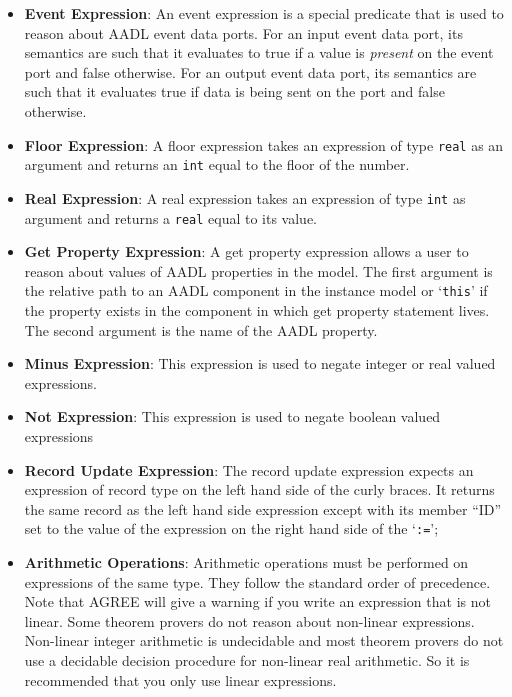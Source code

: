 \documentclass{llncs}
\begin{document}
\begin{itemize}
\item \textbf{Event Expression}: An event expression is a special predicate that is used to reason about AADL event data ports.  For an input event data port, its semantics are such that it evaluates to true if a value is \textit{present} on the event port and false otherwise. For an output event data port, its semantics are such that it evaluates true if data is being sent on the port and false otherwise.

\item \textbf{Floor Expression}: A floor expression takes an expression of type \texttt{real} as an argument and returns an \texttt{int} equal to the floor of the number.

\item \textbf{Real Expression}: A real expression takes an expression of type \texttt{int} as argument and returns a \texttt{real} equal to its value.

\item \textbf{Get Property Expression}: A get property expression allows a user to reason about values of AADL properties in the model.  The first argument is the relative path to an AADL component in the instance model or `\texttt{this}' if the property exists in the component in which get property statement lives.  The second argument is the name of the AADL property.

\item \textbf{Minus Expression}: This expression is used to negate integer or real valued expressions.

\item \textbf{Not Expression}: This expression is used to negate boolean valued expressions

\item \textbf{Record Update Expression}: The record update expression expects an expression of record type on the left hand side of the curly braces.  It returns the same record as the left hand side expression except with its member ``ID'' set to the value of the expression on the right hand side of the `\texttt{:=}';

\item \textbf{Arithmetic Operations}: Arithmetic operations must be performed on expressions of the same type.  They follow the standard order of precedence.  Note that AGREE will give a warning if you write an expression that is not linear.  Some theorem provers do not reason about non-linear expressions.  Non-linear integer arithmetic is undecidable and most theorem provers do not use a decidable decision procedure for non-linear real arithmetic.  So it is recommended that you only use linear expressions.


\end{itemize}
\end{document}
